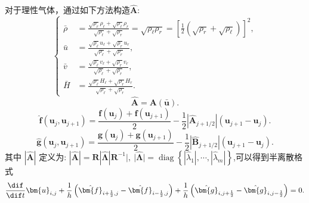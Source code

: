\documentclass[12pt]{article}
\begin{document}
对于理性气体，通过如下方法构造$\hat{\bm{A}}$:
\begin{equation}
	\left\{
	\begin{aligned}
		\bar{\rho} & =\frac{\sqrt{\rho_{r}} \rho_{\ell}+\sqrt{\rho_{\ell}} \rho_{r}}{\sqrt{\rho_{\ell}}+\sqrt{\rho_{r}}}=\sqrt{\rho_{\ell} \rho_{r}}=\left[\frac{1}{2}\left(\sqrt{\rho_{r}} +\sqrt{\rho_{\ell}} \right)\right]^2, \\
		\bar{u}    & =\frac{\sqrt{\rho_{\ell}} u_{\ell}+\sqrt{\rho_{r}} u_{r}}{\sqrt{\rho_{\ell}}+\sqrt{\rho_{r}}},                                                                                                               \\
		\bar{v}    & =\frac{\sqrt{\rho_{\ell}} v_{\ell}+\sqrt{\rho_{r}} v_{r}}{\sqrt{\rho_{\ell}}+\sqrt{\rho_{r}}},                                                                                                               \\
		\bar{H}    & =\frac{\sqrt{\rho_{\ell}} H_{\ell}+\sqrt{\rho_{r}} H_{r}}{\sqrt{\rho_{\ell}}+\sqrt{\rho_{r}}}.
	\end{aligned}\right.
\end{equation}
\begin{equation}
	\hat{\bm{A}}=\bm{A}(\bm{\bar{u}}).
\end{equation}
\begin{equation}
	\hat{\bm{f}}\left(\bm{u}_{j}, \bm{u}_{j+1}\right)=\frac{\bm{f}\left(\bm{u}_{j}\right)+\bm{f}\left(\bm{u}_{j+1}\right)}{2}-\frac{1}{2}\left|\hat{\bm{A}}_{j+1 / 2}\right|\left(\bm{u}_{j+1}-\bm{u}_{j}\right).
\end{equation}
\begin{equation}
	\hat{\bm{g}}\left(\bm{u}_{j}, \bm{u}_{j+1}\right)=\frac{\bm{g}\left(\bm{u}_{j}\right)+\bm{g}\left(\bm{u}_{j+1}\right)}{2}-\frac{1}{2}\left|\hat{\bm{B}}_{j+1 / 2}\right|\left(\bm{u}_{j+1}-\bm{u}_{j}\right).
	\label{eq:10}
\end{equation}
其中 $|\hat{\bm{A}}|$ 定义为: $|\hat{\bm{A}}|=\bm{R}|\hat{\bm{\Lambda}}| \bm{R}^{-1}|,\ |\hat{\bm{\Lambda}} \mid=\operatorname{diag}\left\{\left|\hat{\lambda}_{1}\right|, \cdots,\left|\hat{\lambda}_{m}\right|\right\}$,可以得到半离散格式\cite[P294]{cfd}
\begin{equation}
	\frac{\dif}{\dif t}\bm{u}_{i,j} + \frac{1}{h}\left(\hat{\bm{f}}_{i+\frac{1}{2},j}-\hat{\bm{f}}_{i-\frac{1}{2},j}\right)+ \frac{1}{h}\left(\hat{\bm{g}}_{i,j+\frac{1}{2}}-\hat{\bm{g}}_{i,j-\frac{1}{2}}\right)=0.
\end{equation}
\end{document}
